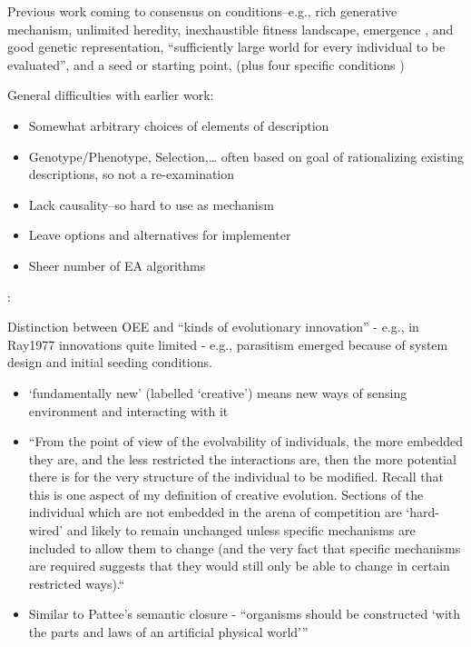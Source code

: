 Previous work coming to consensus on conditions--e.g., rich generative mechanism, unlimited heredity, inexhaustible fitness landscape, emergence \autocite{Vasas2015}, and good genetic representation, ``sufficiently large world for every individual to be evaluated'', and a seed or starting point, (plus four specific conditions \autocite{Soros2014})

General difficulties with earlier work:
\begin{itemize}
	\item Somewhat arbitrary choices of elements of description
	\item Genotype/Phenotype, Selection,\ldots{} often based on goal of rationalizing existing descriptions, so not a re-examination
	\item Lack causality--so hard to use as mechanism
	\item Leave options and alternatives for implementer
	\item Sheer number of EA algorithms
\end{itemize}




\autocite{Taylor2001}:

Distinction between OEE and ``kinds of evolutionary innovation'' -
e.g., in Ray1977 innovations quite limited - e.g., parasitism emerged
because of system design and initial seeding conditions.

\begin{itemize}
	\item
	
	`fundamentally new' (labelled `creative') means new ways of sensing
	environment and interacting with it
	
	\item
	
	``From the point of view of the evolvability of individuals, the
	more embedded they are, and the less restricted the interactions
	are, then the more potential there is for the very structure of the
	individual to be modified. Recall that this is one aspect of my
	definition of creative evolution. Sections of the individual which
	are not embedded in the arena of competition are `hard-wired' and
	likely to remain unchanged unless specific mechanisms are included
	to allow them to change (and the very fact that specific mechanisms
	are required suggests that they would still only be able to change
	in certain restricted ways).``
	
	\item
	
	Similar to Pattee's semantic closure - ``organisms should be
	constructed `with the parts and laws of an artificial physical
	world'''
	
\end{itemize}


